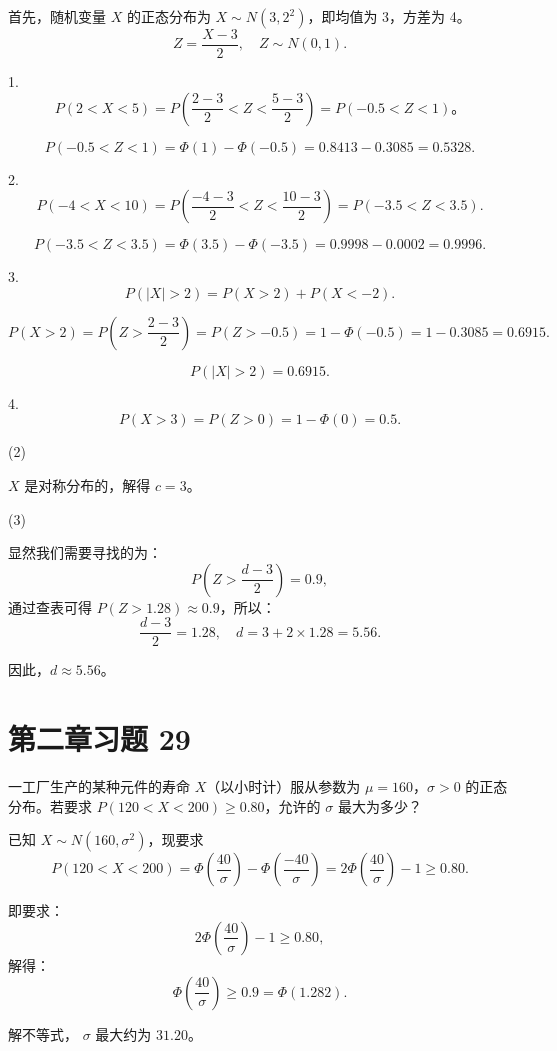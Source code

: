 \documentclass[twoside]{article}
\begin{document}
\begin{ans}{26}{26}

首先，随机变量 $X$ 的正态分布为 $X \sim N(3, 2^2)$，即均值为 3，方差为 4。
\[
Z = \frac{X - 3}{2}, \quad Z \sim N(0, 1).
\]

    1.
    \[
    P(2 < X < 5) = P\left(\frac{2 - 3}{2} < Z < \frac{5 - 3}{2}\right) = P(-0.5 < Z < 1)。
    \]

    \[
    P(-0.5 < Z < 1) = \Phi(1) - \Phi(-0.5) = 0.8413 - 0.3085 = 0.5328.
    \]
    
    2.
    \[
    P(-4 < X < 10) = P\left(\frac{-4 - 3}{2} < Z < \frac{10 - 3}{2}\right) = P(-3.5 < Z < 3.5).
    \]
 
    \[
    P(-3.5 < Z < 3.5) = \Phi(3.5) - \Phi(-3.5) = 0.9998 - 0.0002 = 0.9996.
    \]
    
    3.
    \[
    P(|X| > 2) = P(X > 2) + P(X < -2).
    \]

    \[
    P(X > 2) = P\left(Z > \frac{2 - 3}{2}\right) = P(Z > -0.5) = 1 - \Phi(-0.5) = 1 - 0.3085 = 0.6915.
    \]

    \[
    P(|X| > 2) = 0.6915.
    \]
    
    4.
    \[
    P(X > 3) = P(Z > 0) = 1 - \Phi(0) = 0.5.
    \]
    
    (2) 
    
    $X$ 是对称分布的，解得 $c = 3$。
    
    (3)

    显然我们需要寻找的为：
    \[
    P\left(Z > \frac{d - 3}{2}\right) = 0.9,
    \]
    通过查表可得 $P(Z > 1.28) \approx 0.9$，所以：
    \[
    \frac{d - 3}{2} = 1.28, \quad d = 3 + 2 \times 1.28 = 5.56.
    \]
    
    因此，$d \approx 5.56$。


\end{ans}

\section{第二章习题 29}

一工厂生产的某种元件的寿命 $X$（以小时计）服从参数为 $\mu = 160$，$\sigma > 0$ 的正态分布。若要求 $P(120 < X < 200) \geq 0.80$，允许的 $\sigma$ 最大为多少？

\begin{ans}{29}{29}

    已知 $X \sim N(160, \sigma^2)$，现要求
\[
P(120 < X < 200) = \Phi\left(\frac{40}{\sigma}\right) - \Phi\left(\frac{-40}{\sigma}\right) = 2\Phi\left(\frac{40}{\sigma}\right) - 1 \geq 0.80.
\]

即要求：
\[
2\Phi\left(\frac{40}{\sigma}\right) - 1 \geq 0.80,
\]
解得：
\[
\Phi\left(\frac{40}{\sigma}\right) \geq 0.9 = \Phi(1.282).
\]

解不等式， $\sigma$ 最大约为 $31.20$。

\end{ans}
\end{document}
